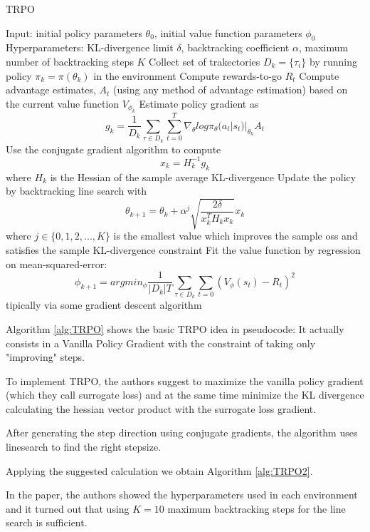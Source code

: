 \documentclass[12pt,a4paper]{article}
\begin{document}
\begin{algorithm}[H]
    \caption{TRPO}
\begin{algorithmic}[1]
\STATE Input: initial policy parameters $\theta_0$, initial value function parameters $\phi_0$
\STATE Hyperparameters: KL-divergence limit $\delta$, backtracking coefficient $\alpha$, maximum number of backtracking steps $K$
    \STATE Collect set of trakectories $D_k = \{\tau_i\}$ by running policy $\pi_k = \pi(\theta_k)$ in the environment
    \STATE Compute rewards-to-go $R_t$
    \STATE Compute advantage estimates, $A_t$ (using any method of advantage estimation) based on the current value function $V_{\phi_k}$
    \STATE Estimate policy gradient as
    $$ g_k = \frac{1}{D_k} \sum_{\tau \in D_k} \sum_{t=0}^T \nabla_{\theta} log \pi_\theta(a_t|s_t)|_{\theta_k} A_t$$
    \STATE Use the conjugate gradient algorithm to compute
    $$x_k = H^{-1}_k g_k$$
    where $H_k$ is the Hessian of the sample average KL-divergence
    \STATE Update the policy by backtracking line search with
    $$\theta_{k+1} = \theta_k + \alpha^j \sqrt{\frac{2\delta}{x_k^T H_kx_k}}x_k$$
    where $j \in \{0,1,2,...,K\}$ is the smallest value which improves the sample oss and satisfies the sample KL-divergence constraint
    \STATE Fit the value function by regression on mean-squared-error:
    $$\phi_{k+1} = arg min_\phi \frac{1}{|D_k|T}\sum_{\tau \in D_k} \sum_{t=0}(V_\phi(s_t) - R_t)^2$$
    tipically via some gradient descent algorithm
\ENDFOR
\end{algorithmic}
\label{alg:TRPO2}
\end{algorithm}

Algorithm \ref{alg:TRPO} shows the basic TRPO idea in pseudocode: It actually consists in a Vanilla Policy Gradient with the constraint of taking only "improving" steps.

To implement TRPO, the authors suggest to maximize the vanilla policy gradient (which they call surrogate loss) and at the same time minimize the KL divergence calculating the hessian vector product with the surrogate loss gradient.

After generating the step direction using conjugate gradients, the algorithm uses linesearch to find the right stepsize.

Applying the suggested calculation we obtain Algorithm \ref{alg:TRPO2}.

In the paper, the authors showed the hyperparameters used in each environment and it turned out that using $K=10$ maximum backtracking steps for the line search is sufficient.
\end{document}
